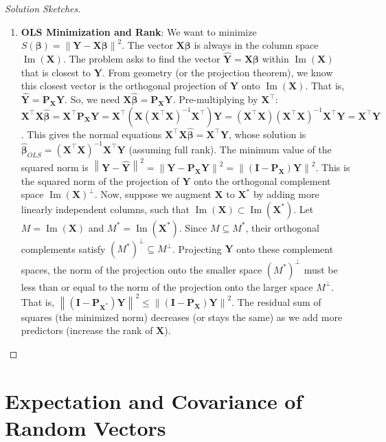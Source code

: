 \documentclass[11pt, a4paper]{article}
\DeclareMathOperator{\Image}{\mathrm{Im}}        %
\theoremstyle{definition}
\theoremstyle{remark}
\newcommand{\mat}[1]{\mathbf{#1}}       %
\newcommand{\vect}[1]{\bm{#1}}          %
\newcommand{\transpose}{^{\top}}        %
\newcommand{\norm}[1]{\left\| #1 \right\|} %
\begin{document}
\begin{proof}[Solution Sketches]
\begin{enumerate}
    \item \textbf{OLS Minimization and Rank}: We want to minimize $S(\vect{\beta}) = \norm{\vect{Y} - \mat{X}\vect{\beta}}^2$. The vector $\mat{X}\vect{\beta}$ is always in the column space $\Image(\mat{X})$. The problem asks to find the vector $\hat{\vect{Y}} = \mat{X}\vect{\beta}$ within $\Image(\mat{X})$ that is closest to $\vect{Y}$. From geometry (or the projection theorem), we know this closest vector is the orthogonal projection of $\vect{Y}$ onto $\Image(\mat{X})$. That is, $\hat{\vect{Y}} = \mat{P}_{\mat{X}}\vect{Y}$.
    So, we need $\mat{X}\hat{\vect{\beta}} = \mat{P}_{\mat{X}}\vect{Y}$. Pre-multiplying by $\mat{X}\transpose$:
    $\mat{X}\transpose \mat{X} \hat{\vect{\beta}} = \mat{X}\transpose \mat{P}_{\mat{X}} \vect{Y} = \mat{X}\transpose (\mat{X}(\mat{X}\transpose \mat{X})^{-1}\mat{X}\transpose) \vect{Y} = (\mat{X}\transpose \mat{X})(\mat{X}\transpose \mat{X})^{-1}\mat{X}\transpose \vect{Y} = \mat{X}\transpose \vect{Y}$.
    This gives the normal equations $\mat{X}\transpose \mat{X} \hat{\vect{\beta}} = \mat{X}\transpose \vect{Y}$, whose solution is $\hat{\vect{\beta}}_{OLS} = (\mat{X}\transpose \mat{X})^{-1} \mat{X}\transpose \vect{Y}$ (assuming full rank).
    The minimum value of the squared norm is $\norm{\vect{Y} - \hat{\vect{Y}}}^2 = \norm{\vect{Y} - \mat{P}_{\mat{X}}\vect{Y}}^2 = \norm{(\mat{I} - \mat{P}_{\mat{X}})\vect{Y}}^2$. This is the squared norm of the projection of $\vect{Y}$ onto the orthogonal complement space $\Image(\mat{X})^{\perp}$.
    Now, suppose we augment $\mat{X}$ to $\mat{X}^*$ by adding more linearly independent columns, such that $\Image(\mat{X}) \subset \Image(\mat{X}^*)$. Let $M = \Image(\mat{X})$ and $M^* = \Image(\mat{X}^*)$. Since $M \subseteq M^*$, their orthogonal complements satisfy $(M^*)^{\perp} \subseteq M^{\perp}$. Projecting $\vect{Y}$ onto these complement spaces, the norm of the projection onto the smaller space $(M^*)^{\perp}$ must be less than or equal to the norm of the projection onto the larger space $M^{\perp}$. That is, $\norm{(\mat{I} - \mat{P}_{\mat{X}^*})\vect{Y}}^2 \leq \norm{(\mat{I} - \mat{P}_{\mat{X}})\vect{Y}}^2$. The residual sum of squares (the minimized norm) decreases (or stays the same) as we add more predictors (increase the rank of $\mat{X}$).
\end{enumerate}
\end{proof}

\section{Expectation and Covariance of Random Vectors}
\end{document}
